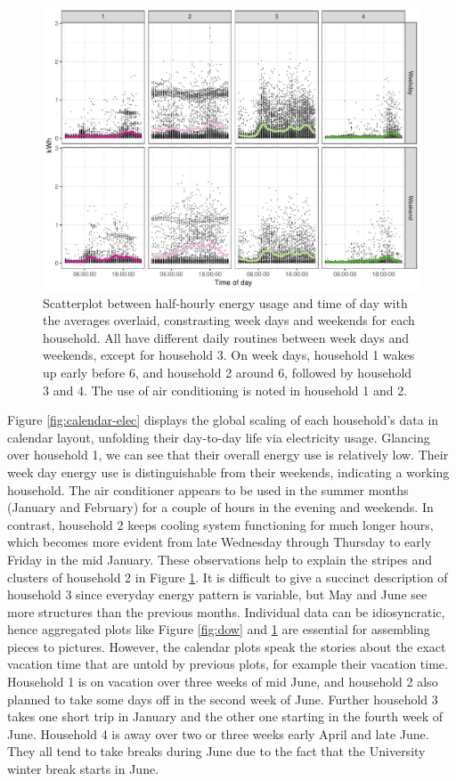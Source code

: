 \documentclass[12pt]{article}
\begin{document}
\begin{figure}

{\centering \includegraphics[width=\textwidth]{figure/hod-1} 

}

\caption{Scatterplot between half-hourly energy usage and time of day with the averages overlaid, constrasting week days and weekends for each household. All have different daily routines between week days and weekends, except for household 3. On week days, household 1 wakes up early before 6, and household 2 around 6, followed by household 3 and 4. The use of air conditioning is noted in household 1 and 2.}\label{fig:hod}
\end{figure}

Figure \ref{fig:calendar-elec} displays the global scaling of each household's data in calendar layout, unfolding their day-to-day life via electricity usage. Glancing over household 1, we can see that their overall energy use is relatively low. Their week day energy use is distinguishable from their weekends, indicating a working household. The air conditioner appears to be used in the summer months (January and February) for a couple of hours in the evening and weekends. In contrast, household 2 keeps cooling system functioning for much longer hours, which becomes more evident from late Wednesday through Thursday to early Friday in the mid January. These observations help to explain the stripes and clusters of household 2 in Figure \ref{fig:hod}. It is difficult to give a succinct description of household 3 since everyday energy pattern is variable, but May and June see more structures than the previous months. Individual data can be idiosyncratic, hence aggregated plots like Figure \ref{fig:dow} and \ref{fig:hod} are essential for assembling pieces to pictures. However, the calendar plots speak the stories about the exact vacation time that are untold by previous plots, for example their vacation time. Household 1 is on vacation over three weeks of mid June, and household 2 also planned to take some days off in the second week of June. Further household 3 takes one short trip in January and the other one starting in the fourth week of June. Household 4 is away over two or three weeks early April and late June. They all tend to take breaks during June due to the fact that the University winter break starts in June.
\end{document}
